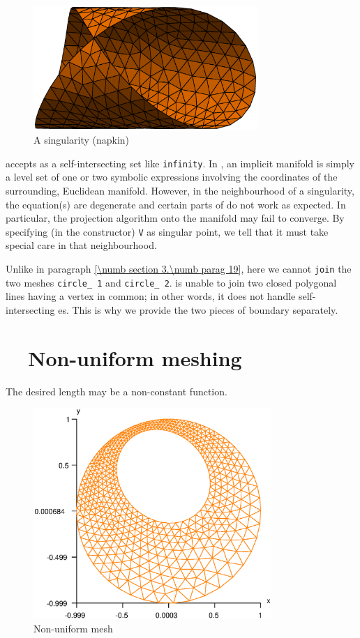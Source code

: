 \begin{figure}[ht] \centering
 \includegraphics[width=85mm]{cyl}
  \caption{A singularity (napkin)}
  \label{\numb section 3.\numb fig 10}
\end{figure}

{\ManiFEM} accepts as {\small\tt{}} a self-intersecting set like {\small\tt infinity}.
In {\maniFEM}, an implicit manifold is simply a level set of one or two symbolic expressions
involving the coordinates of the surrounding, Euclidean manifold.
However, in the neighbourhood of a singularity, the equation(s) are degenerate and certain
parts of {\maniFEM} do not work as expected.
In particular, the projection algorithm onto the manifold may fail to converge.
By specifying (in the {\small\tt{}} constructor) {\small\tt V} as singular point,
we tell {\maniFEM} that it must take special care in that neighbourhood.

Unlike in paragraph \ref{\numb section 3.\numb parag 19}, here we cannot {\small\tt join} the
two meshes {\small\tt circle\_\,1} and {\small\tt circle\_\,2}.
{\ManiFEM} is unable to join two closed polygonal lines having a vertex in common;
in other words, it does not handle self-intersecting {\small\tt{}}es.
This is why we provide the two pieces of boundary separately.


\section{~~Non-uniform meshing}\label{\numb section 3.\numb parag 22}

The desired length may be a non-constant function.

\begin{figure}[ht] \centering
 \includegraphics[width=90mm]{disk-non-unif}
  \caption{Non-uniform mesh}
  \label{\numb section 3.\numb fig 11}
\end{figure}

